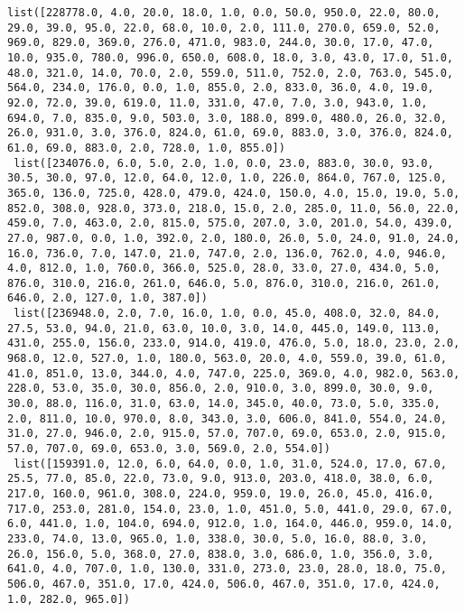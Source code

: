 \documentclass[11pt]{article}
\begin{document}
\begin{Verbatim}[commandchars=\\\{\}]
 list([228778.0, 4.0, 20.0, 18.0, 1.0, 0.0, 50.0, 950.0, 22.0, 80.0, 29.0, 39.0, 95.0, 22.0, 68.0, 10.0, 2.0, 111.0, 270.0, 659.0, 52.0, 969.0, 829.0, 369.0, 276.0, 471.0, 983.0, 244.0, 30.0, 17.0, 47.0, 10.0, 935.0, 780.0, 996.0, 650.0, 608.0, 18.0, 3.0, 43.0, 17.0, 51.0, 48.0, 321.0, 14.0, 70.0, 2.0, 559.0, 511.0, 752.0, 2.0, 763.0, 545.0, 564.0, 234.0, 176.0, 0.0, 1.0, 855.0, 2.0, 833.0, 36.0, 4.0, 19.0, 92.0, 72.0, 39.0, 619.0, 11.0, 331.0, 47.0, 7.0, 3.0, 943.0, 1.0, 694.0, 7.0, 835.0, 9.0, 503.0, 3.0, 188.0, 899.0, 480.0, 26.0, 32.0, 26.0, 931.0, 3.0, 376.0, 824.0, 61.0, 69.0, 883.0, 3.0, 376.0, 824.0, 61.0, 69.0, 883.0, 2.0, 728.0, 1.0, 855.0])
 list([234076.0, 6.0, 5.0, 2.0, 1.0, 0.0, 23.0, 883.0, 30.0, 93.0, 30.5, 30.0, 97.0, 12.0, 64.0, 12.0, 1.0, 226.0, 864.0, 767.0, 125.0, 365.0, 136.0, 725.0, 428.0, 479.0, 424.0, 150.0, 4.0, 15.0, 19.0, 5.0, 852.0, 308.0, 928.0, 373.0, 218.0, 15.0, 2.0, 285.0, 11.0, 56.0, 22.0, 459.0, 7.0, 463.0, 2.0, 815.0, 575.0, 207.0, 3.0, 201.0, 54.0, 439.0, 27.0, 987.0, 0.0, 1.0, 392.0, 2.0, 180.0, 26.0, 5.0, 24.0, 91.0, 24.0, 16.0, 736.0, 7.0, 147.0, 21.0, 747.0, 2.0, 136.0, 762.0, 4.0, 946.0, 4.0, 812.0, 1.0, 760.0, 366.0, 525.0, 28.0, 33.0, 27.0, 434.0, 5.0, 876.0, 310.0, 216.0, 261.0, 646.0, 5.0, 876.0, 310.0, 216.0, 261.0, 646.0, 2.0, 127.0, 1.0, 387.0])
 list([236948.0, 2.0, 7.0, 16.0, 1.0, 0.0, 45.0, 408.0, 32.0, 84.0, 27.5, 53.0, 94.0, 21.0, 63.0, 10.0, 3.0, 14.0, 445.0, 149.0, 113.0, 431.0, 255.0, 156.0, 233.0, 914.0, 419.0, 476.0, 5.0, 18.0, 23.0, 2.0, 968.0, 12.0, 527.0, 1.0, 180.0, 563.0, 20.0, 4.0, 559.0, 39.0, 61.0, 41.0, 851.0, 13.0, 344.0, 4.0, 747.0, 225.0, 369.0, 4.0, 982.0, 563.0, 228.0, 53.0, 35.0, 30.0, 856.0, 2.0, 910.0, 3.0, 899.0, 30.0, 9.0, 30.0, 88.0, 116.0, 31.0, 63.0, 14.0, 345.0, 40.0, 73.0, 5.0, 335.0, 2.0, 811.0, 10.0, 970.0, 8.0, 343.0, 3.0, 606.0, 841.0, 554.0, 24.0, 31.0, 27.0, 946.0, 2.0, 915.0, 57.0, 707.0, 69.0, 653.0, 2.0, 915.0, 57.0, 707.0, 69.0, 653.0, 3.0, 569.0, 2.0, 554.0])
 list([159391.0, 12.0, 6.0, 64.0, 0.0, 1.0, 31.0, 524.0, 17.0, 67.0, 25.5, 77.0, 85.0, 22.0, 73.0, 9.0, 913.0, 203.0, 418.0, 38.0, 6.0, 217.0, 160.0, 961.0, 308.0, 224.0, 959.0, 19.0, 26.0, 45.0, 416.0, 717.0, 253.0, 281.0, 154.0, 23.0, 1.0, 451.0, 5.0, 441.0, 29.0, 67.0, 6.0, 441.0, 1.0, 104.0, 694.0, 912.0, 1.0, 164.0, 446.0, 959.0, 14.0, 233.0, 74.0, 13.0, 965.0, 1.0, 338.0, 30.0, 5.0, 16.0, 88.0, 3.0, 26.0, 156.0, 5.0, 368.0, 27.0, 838.0, 3.0, 686.0, 1.0, 356.0, 3.0, 641.0, 4.0, 707.0, 1.0, 130.0, 331.0, 273.0, 23.0, 28.0, 18.0, 75.0, 506.0, 467.0, 351.0, 17.0, 424.0, 506.0, 467.0, 351.0, 17.0, 424.0, 1.0, 282.0, 965.0])

\end{Verbatim}
\end{document}
